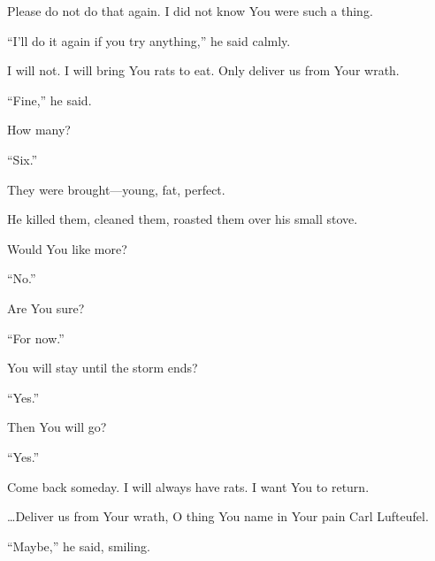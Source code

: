 Please do not do that again.
I did not know You were such a thing.

“I’ll do it again if you try anything,” he said calmly.

I will not.
I will bring You rats to eat.
Only deliver us from Your wrath.

“Fine,” he said.

How many?

“Six.”

They were brought—young, fat, perfect.

He killed them, cleaned them, roasted them over his small stove.

Would You like more?

“No.”

Are You sure?

“For now.”

You will stay until the storm ends?

“Yes.”

Then You will go?

“Yes.”

Come back someday.
I will always have rats.
I want You to return.

…Deliver us from Your wrath,
O thing You name in Your pain
Carl Lufteufel.

“Maybe,” he said, smiling.
